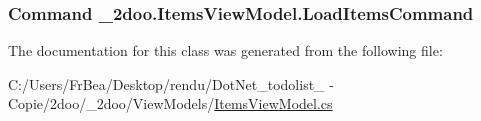 \hypertarget{class__2doo_1_1_items_view_model_cc5e5c6cb7dd40801dbdbaf659adffc9}{
\subsubsection[{LoadItemsCommand}]{\setlength{\rightskip}{0pt plus 5cm}Command \_\-2doo.ItemsViewModel.LoadItemsCommand}}
\label{class__2doo_1_1_items_view_model_cc5e5c6cb7dd40801dbdbaf659adffc9}




The documentation for this class was generated from the following file:\begin{CompactItemize}
\item 
C:/Users/FrBea/Desktop/rendu/DotNet\_\-todolist\_ - Copie/2doo/\_\-2doo/ViewModels/\hyperlink{_items_view_model_8cs}{ItemsViewModel.cs}\end{CompactItemize}
